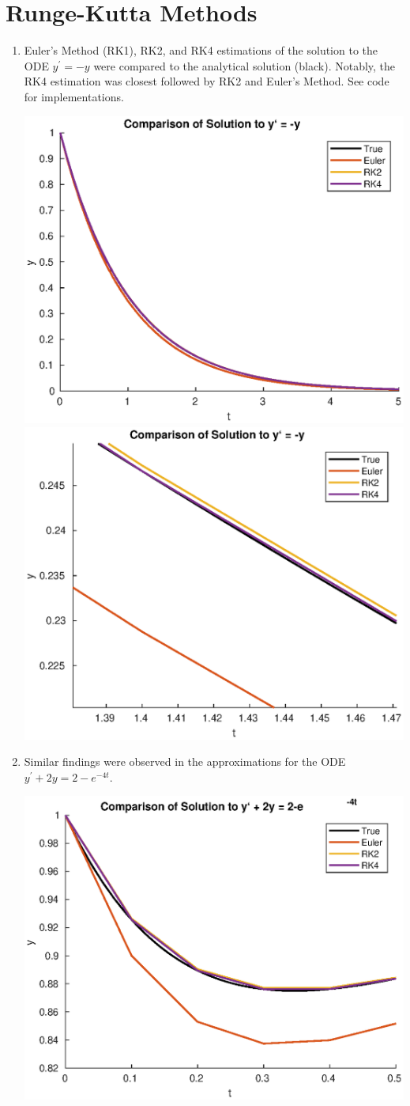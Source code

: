 \documentclass[12pt]{extarticle}
\begin{document}
\newpage
\section{Runge-Kutta Methods}
\begin{enumerate}

\item Euler's Method (RK1), RK2, and RK4 estimations of the solution to the ODE $y^{\prime} = -y$ were compared to the analytical solution (black). Notably, the RK4 estimation was closest followed by RK2 and Euler's Method. See code for implementations.
\begin{center}
\includegraphics[width = .47\textwidth]{comp1}
\includegraphics[width = .43\textwidth]{zoomed_in}
\end{center}

\item Similar findings were observed in the approximations for the ODE $y^{\prime} + 2y = 2-e^{-4t}$. 
\begin{center}
\includegraphics[width = .65\textwidth]{comp2}
\end{center}
\end{enumerate}
\end{document}
